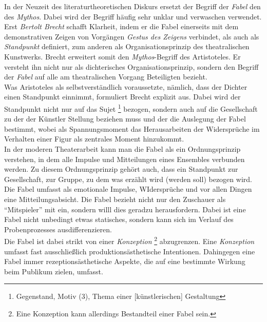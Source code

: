 \documentclass[ngerman, a4paper, twoside]{scrbook}%
\begin{document}
	In der Neuzeit des literaturtheoretischen Diskurs ersetzt der Begriff der \emph{Fabel} den des \emph{Mythos}. Dabei wird der Begriff häufig sehr unklar und verwaschen verwendet. Erst \emph{Bertolt Brecht} schafft Klarheit, indem er die Fabel einerseits mit dem demonstrativen Zeigen von Vorgängen \emph{Gestus des Zeigens} verbindet, als auch als \emph{Standpunkt} definiert, zum anderen als Organisationsprinzip des theatralischen Kunstwerks. Brecht erweitert somit den \emph{Mythos}-Begriff des Artistoteles. Er versteht ihn nicht nur als dichterisches Organisationsprinzip, sondern den Begriff der \emph{Fabel} auf alle am theatralischen Vorgang Beteiligten bezieht.\\

	Was Aristoteles als selbstverständlich voraussetzte, nämlich, dass der Dichter einen Standpunkt einnimmt, formuliert Brecht explizit aus. Dabei wird der Standpunkt nicht nur auf das Sujet
	\footnote{Gegenstand, Motiv (3), Thema einer [künstlerischen] Gestaltung}
	bezogen, sondern auch auf die Gesellschaft zu der der Künstler Stellung beziehen muss und der die Auslegung der Fabel bestimmt, wobei als Spannungsmoment das Herausarbeiten der Widersprüche im Verhalten einer Figur als zentrales Moment hinzukommt.\\

	In der moderen Theaterarbeit kann man die Fabel als ein Ordnungsprinzip verstehen, in dem alle Impulse und Mitteilungen eines Ensembles verbunden werden. Zu diesem Ordnungsprinzip gehört auch, dass ein Standpunkt zur Gesellschaft, zur Gruppe, zu dem was erzählt wird (werden soll) bezogen wird. Die Fabel umfasst als emotionale Impulse, WIdersprüche und vor allen Dingen eine Mitteilungsabsicht. Die Fabel bezieht nicht nur den Zuschauer als "`Mitspieler"' mit ein, sondern willl dies geradzu herausfordern. Dabei ist eine Fabel nicht unbedingt etwas statisches, sondern kann sich im Verlauf des Probenprozesses ausdifferenzieren.\\

	Die Fabel ist dabei strikt von einer \emph{Konzeption}
	\footnote{Eine Konzeption kann allerdings Bestandteil einer Fabel sein.}
	abzugrenzen. Eine \emph{Konzeption} umfasst fast ausschließlich produktionsästhetische Intentionen. Dahingegen eine Fabel immer rezeptionsästhetische Aspekte, die auf eine bestimmte Wirkung beim Publikum zielen, umfasst.
\end{document}
